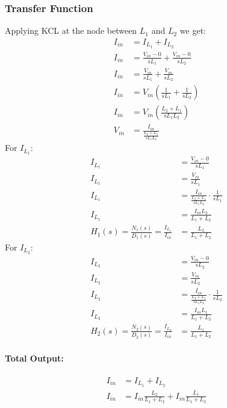 \subsubsection{Transfer Function}
Applying KCL at the node between \(L_1\) and \(L_2\) we get:
\begin{align*}
  I_{in} &= I_{L_1} + I_{L_2} \\
  I_{in} &= \frac{V_{in} - 0}{sL_1} + \frac{V_{in} - 0}{sL_2} \\
  I_{in} &= \frac{V_{in}}{sL_1} + \frac{V_{in}}{sL_2} \\
  I_{in} &= V_{in}\left(\frac{1}{sL_1} + \frac{1}{sL_2}\right) \\
  I_{in} &= V_{in}\left(\frac{L_2 + L_1}{sL_1 L_2}\right) \\
  V_{in} &= \frac{I_{in}}{\frac{L_2 + L_1}{sL_1 L_2}}
\end{align*}
For \(I_{L_1}\):
\begin{align*}
  I_{L_1} &= \frac{V_{in} - 0}{sL_1} \\
  I_{L_1} &= \frac{V_{in}}{sL_1} \\
  I_{L_1} &= \frac{I_{in}}{\frac{L_2 + L_1}{sL_1 L_2}} \cdot \frac{1}{sL_1} \\
  I_{L_1} &= \frac{I_{in} L_2}{L_1 + L_2} \\
  H_1(s) = \frac{N_1(s)}{D_1(s)} = \frac{I_{L_1}}{I_{in}} &= \frac{L_2}{L_1 + L_2}
\end{align*}
For \(I_{L_2}\):
\begin{align*}
  I_{L_2} &= \frac{V_{in} - 0}{sL_2} \\
  I_{L_2} &= \frac{V_{in}}{sL_2} \\
  I_{L_2} &= \frac{I_{in}}{\frac{L_2 + L_1}{sL_1 L_2}} \cdot \frac{1}{sL_2} \\
  I_{L_2} &= \frac{I_{in} L_1}{L_1 + L_2} \\
  H_2(s) = \frac{N_2(s)}{D_2(s)} = \frac{I_{L_2}}{I_{in}} &= \frac{L_1}{L_1 + L_2}
\end{align*}
\paragraph{Total Output:}
\begin{align*}
  I_{in} &= I_{L_1} + I_{L_2} \\
  I_{in} &= I_{in} \frac{L_2}{L_1 + L_2} + I_{in} \frac{L_1}{L_1 + L_2}
\end{align*}

